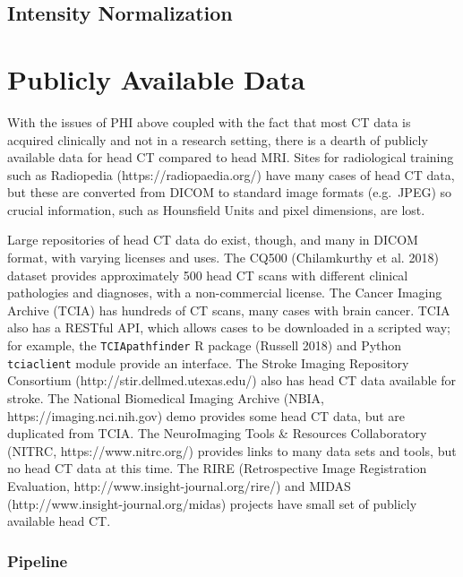 \documentclass[]{elsarticle} %
\begin{document}
\hypertarget{intensity-normalization}{%
\subsection{Intensity Normalization}\label{intensity-normalization}}

\hypertarget{publicly-available-data}{%
\section{Publicly Available Data}\label{publicly-available-data}}

With the issues of PHI above coupled with the fact that most CT data is acquired clinically and not in a research setting, there is a dearth of publicly available data for head CT compared to head MRI. Sites for radiological training such as Radiopedia (https://radiopaedia.org/) have many cases of head CT data, but these are converted from DICOM to standard image formats (e.g.~JPEG) so crucial information, such as Hounsfield Units and pixel dimensions, are lost.

Large repositories of head CT data do exist, though, and many in DICOM format, with varying licenses and uses. The CQ500 (Chilamkurthy et al. 2018) dataset provides approximately 500 head CT scans with different clinical pathologies and diagnoses, with a non-commercial license. The Cancer Imaging Archive (TCIA) has hundreds of CT scans, many cases with brain cancer. TCIA also has a RESTful API, which allows cases to be downloaded in a scripted way; for example, the \texttt{TCIApathfinder} R package (Russell 2018) and Python \texttt{tciaclient} module provide an interface. The Stroke Imaging Repository Consortium (http://stir.dellmed.utexas.edu/) also has head CT data available for stroke. The National Biomedical Imaging Archive (NBIA, https://imaging.nci.nih.gov) demo provides some head CT data, but are duplicated from TCIA. The NeuroImaging Tools \& Resources Collaboratory (NITRC, https://www.nitrc.org/) provides links to many data sets and tools, but no head CT data at this time. The RIRE (Retrospective Image Registration Evaluation, http://www.insight-journal.org/rire/) and MIDAS (http://www.insight-journal.org/midas) projects have small set of publicly available head CT.

\hypertarget{pipeline}{%
\subsubsection{Pipeline}\label{pipeline}}
\end{document}
